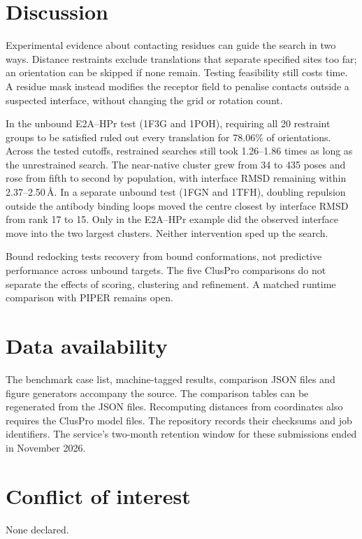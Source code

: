 \documentclass[10pt,twocolumn]{article}
\begin{document}
\section{Discussion}
Experimental evidence about contacting residues can guide the search in two
ways. Distance restraints exclude translations that separate specified sites
too far; an orientation can be skipped if none remain. Testing feasibility
still costs time. A residue mask instead modifies the receptor field to penalise
contacts outside a suspected interface, without changing the grid or rotation count.

In the unbound E2A--HPr test (1F3G and 1POH), requiring all 20 restraint groups to be satisfied
ruled out every translation for 78.06\% of orientations. Across the tested
cutoffs, restrained searches still took 1.26--1.86 times as long as the
unrestrained search. The near-native cluster grew from 34 to 435 poses and
rose from fifth to second by population, with interface RMSD remaining
within 2.37--2.50\,\AA{}. In a separate unbound test (1FGN and 1TFH),
doubling repulsion outside the antibody binding loops moved the centre
closest by interface RMSD from rank 17 to 15. Only in the E2A--HPr example
did the observed interface move into the two largest clusters. Neither
intervention sped up the search.

Bound redocking tests recovery from bound conformations, not predictive
performance across unbound targets. The five ClusPro comparisons do not
separate the effects of scoring, clustering and refinement. A matched runtime
comparison with PIPER remains open.

\section*{Data availability}
The benchmark case list, machine-tagged results, comparison JSON files and
figure generators accompany the source. The comparison tables can be regenerated
from the JSON files. Recomputing distances from coordinates also requires the
ClusPro model files. The repository records their checksums and job identifiers.
The service's two-month retention window for these submissions ended in November 2026.

\section*{Conflict of interest}
None declared.
\end{document}
